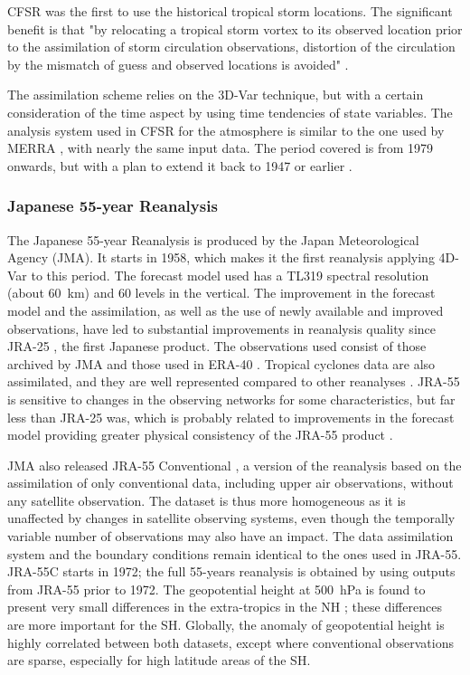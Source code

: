 \documentclass[smallextended]{svjour3}       %
\begin{document}
	CFSR was the first to use the historical tropical storm locations. The significant benefit is that "by relocating a tropical storm vortex to its observed location prior to the assimilation of storm circulation observations, distortion of the circulation by the mismatch of guess and observed locations is avoided" \citep{Saha2010a}.
	
	The assimilation scheme relies on the 3D-Var technique, but with a certain consideration of the time aspect by using time tendencies of state variables. The analysis system used in CFSR for the atmosphere is similar to the one used by MERRA \citep{Rienecker2011}, with nearly the same input data. The period covered is from 1979 onwards, but with a plan to extend it back to 1947 or earlier \citep{Saha2010a}.
	
	
	\subsubsection{Japanese 55-year Reanalysis}
	
	The Japanese 55-year Reanalysis \citep[JRA-55 --][]{Kobayashi2015, Harada2016} is produced by the Japan Meteorological Agency (JMA). It starts in 1958, which makes it the first reanalysis applying 4D-Var to this period. The forecast model used has a TL319 spectral resolution (about 60~km) and 60 levels in the vertical. The improvement in the forecast model and the assimilation, as well as the use of newly available and improved observations, have led to substantial improvements in reanalysis quality since JRA-25 \citep{Onogi2007}, the first Japanese product. The observations used consist of those archived by JMA and those used in ERA-40 \citep{Uppala2005}. Tropical cyclones data are also assimilated, and they are well represented compared to other reanalyses \citep{Harada2016}. JRA-55 is sensitive to changes in the observing networks for some characteristics, but far less than JRA-25 was, which is probably related to improvements in the forecast model providing greater physical consistency of the JRA-55 product \citep{Kobayashi2015}.
	
	JMA also released JRA-55 Conventional \citep[JRA-55C --][]{Kobayashi2014}, a version of the reanalysis based on the assimilation of only conventional data, including upper air observations, without any satellite observation. The dataset is thus more homogeneous as it is unaffected by changes in satellite observing systems, even though the temporally variable number of observations may also have an impact. The data assimilation system and the boundary conditions remain identical to the ones used in JRA-55. JRA-55C starts in 1972; the full 55-years reanalysis is obtained by using outputs from JRA-55 prior to 1972. The geopotential height at 500~hPa is found to present very small differences in the extra-tropics in the NH \citep{Kobayashi2014}; these differences are more important for the SH. Globally, the anomaly of geopotential height is highly correlated between both datasets, except where conventional observations are sparse, especially for high latitude areas of the SH.
	
\end{document}
